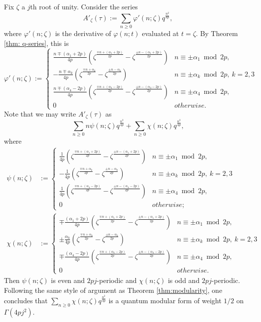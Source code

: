 \documentclass[11pt,letterpaper]{amsart}
\theoremstyle{definition}
\theoremstyle{plain}
\numberwithin{equation}{section}
\theoremstyle{example}
\begin{document}
Fix $\zeta$ a $j$th root of unity. Consider the series
\[A'_\zeta(\tau):= \sum_{n \geq 0} \varphi'(n;\zeta) q^\frac{n^2}{4p},
\]
where $\varphi'(n; \zeta)$ is the derivative of $\varphi(n; t)$ evaluated at $t = \zeta$. By Theorem \ref{thm: q-series}, this is
\[\varphi'(n;\zeta) := \begin{cases}
\frac{n \mp (\alpha_1+2p)}{4p}(\zeta^{\frac{\mp n + (\alpha_1+2p)}{2p}} - \zeta^{\frac{\pm n - (\alpha_1+2p)}{2p}}) & n \equiv \pm \alpha_1 \bmod{2p},  \\
- \frac{n\mp \alpha_k}{4p}(\zeta^\frac{\mp n + \alpha_k}{2p} - \zeta^{\frac{\pm n - \alpha_k}{2p}}) & n \equiv \pm \alpha_k \bmod{2p}, \ k=2,3\\
 \frac{n \mp (\alpha_4 -2p)}{4p}(\zeta^{\frac{\mp n + (\alpha_4-2p)}{2p}} - \zeta^{\frac{\pm n - (\alpha_4-2p)}{2p}}) & n \equiv \pm \alpha_4 \bmod{2p}, \\ 
0 & otherwise. 
\end{cases}\]
Note that we may write $A'_\zeta(\tau)$ as
\[ \sum_{n \geq 0} n \psi(n;\zeta)q^\frac{n^2}{4p} +  \sum_{n \geq 0} \chi(n;\zeta)q^\frac{n^2}{4p}, 
\]
where
\begin{align*}\psi(n;\zeta) &:= \begin{cases}
\frac{1}{4p}(\zeta^{\frac{\mp n + (\alpha_1+2p)}{2p}} - \zeta^{\frac{\pm n - (\alpha_1+2p)}{2p}}) & n \equiv \pm \alpha_1 \bmod{2p},  \\
- \frac{1}{4p}(\zeta^\frac{\mp n + \alpha_k}{2p} - \zeta^{\frac{\pm n - \alpha_k}{2p}}) & n \equiv \pm \alpha_k \bmod{2p}, \ k=2,3\\
\frac{1}{4p}(\zeta^{\frac{\mp n + (\alpha_4-2p)}{2p}} - \zeta^{\frac{\pm n - (\alpha_4-2p)}{2p}}) & n \equiv \pm \alpha_4 \bmod{2p}, \\ 
0 & otherwise;
\end{cases} \\
\chi(n;\zeta) &:= \begin{cases}
\mp \frac{(\alpha_1+2p)}{4p}(\zeta^{\frac{\mp n + (\alpha_1+2p)}{2p}} - \zeta^{\frac{\pm n - (\alpha_1+2p)}{2p}}) & n \equiv \pm \alpha_1 \bmod{2p},  \\
\pm \frac{\alpha_k}{4p}(\zeta^\frac{\mp n + \alpha_k}{2p} - \zeta^{\frac{\pm n - \alpha_k}{2p}}) & n \equiv \pm \alpha_k \bmod{2p}, \ k=2,3\\
 \mp \frac{(\alpha_4 -2p)}{4p}(\zeta^{\frac{\mp n + (\alpha_4-2p)}{2p}} - \zeta^{\frac{\pm n - (\alpha_4-2p)}{2p}}) & n \equiv \pm \alpha_4 \bmod{2p}, \\ 
0 & otherwise. 
\end{cases}\end{align*}
Then $\psi(n;\zeta)$ is even and $2pj$-periodic and $\chi(n;\zeta)$ is odd and $2pj$-periodic. 
Following the same style of argument as Theorem \ref{thm:modularity}, one concludes that $\displaystyle{\sum_{n \geq 0} \chi(n;\zeta)q^\frac{n^2}{4p}}$ is a quantum modular form of weight $1/2$ on $\Gamma(4pj^2)$. 
\end{document}
